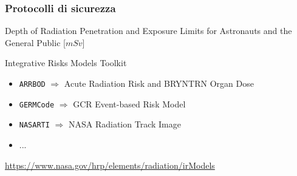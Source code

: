 \documentclass[9pt]{beamer}
\begin{document}
\begin{frame} [fragile]
	\frametitle{Protocolli di sicurezza }
 \begin{exampleblock}{Depth of Radiation Penetration and Exposure Limits for Astronauts and the General Public [$mSv$]}
\begin{center}
\linebreak
\end{center} 
\end{exampleblock}
\begin{alertblock}{Integrative Risks Models Toolkit}
\begin{itemize}
\item \texttt{ARRBOD} $\Longrightarrow$ Acute Radiation Risk and BRYNTRN Organ Dose
\item \texttt{GERMCode} $\Longrightarrow$ GCR Event-based Risk Model
\item \texttt{NASARTI}   $\Longrightarrow$ NASA Radiation Track Image
\item ...
\end{itemize}
\end{alertblock}
\url{https://www.nasa.gov/hrp/elements/radiation/irModels}

\end{frame}
	
\end{document}
